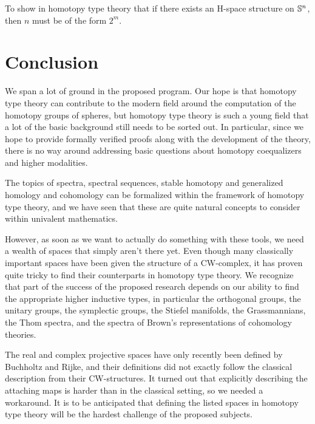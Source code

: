 \documentclass[reqno]{amsart}
\begin{document}
\begin{proposal}\label{p:hspace_structure_on_spheres}
To show in homotopy type theory that if there exists an H-space structure on $\mathbb{S}^{n}$, 
then $n$ must be of the form $2^m$.
\end{proposal}

\section{Conclusion}
We span a lot of ground in the proposed program. Our hope is that homotopy type
theory can contribute to the modern field around the computation of the homotopy
groups of spheres, but homotopy type theory is such a young field that a lot of
the basic background still needs to be sorted out. In particular, since we hope
to provide formally verified proofs along with the development of the theory,
there is no way around addressing basic questions about homotopy coequalizers
and higher modalities. 

The topics of spectra, spectral sequences, stable homotopy and generalized 
homology and cohomology can be formalized within the framework of homotopy type
theory, and we have seen that these are quite natural concepts to consider
within univalent mathematics. 

However, as soon as we want to actually do something with these tools, we need
a wealth of spaces that simply aren't there yet. Even though many classically
important spaces have been given the structure of a CW-complex, it has proven
quite tricky to find their counterparts in homotopy type theory. We recognize
that part of the success of the proposed research depends on our ability to
find the appropriate higher inductive types, in particular the orthogonal groups,
the unitary groups, the symplectic groups, the Stiefel manifolds, the Grassmannians,
the Thom spectra, and the spectra of Brown's representations of cohomology theories.

The real and complex projective spaces have only recently been defined by 
Buchholtz and Rijke, and their definitions did not exactly follow the classical
description from their CW-structures. It turned out that explicitly describing
the attaching maps is harder than in the classical setting, so we needed a
workaround. It is to be anticipated that defining the listed spaces in homotopy
type theory will be the hardest challenge of the proposed subjects.

\printbibliography

\appendix
\end{document}
